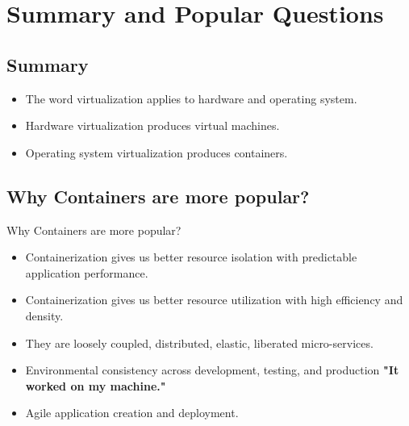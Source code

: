 

\section{Summary and Popular Questions}\label{sec:popular-questions}

\subsection{Summary}\label{subsec:summary}
\begin{frame}
    \begin{itemize}[<+- | alert@+>]
        \item The word virtualization applies to hardware and operating system.
        \item Hardware virtualization produces virtual machines.
        \item Operating system virtualization produces containers.
    \end{itemize}
\end{frame}

\subsection{Why Containers are more popular?}\label{subsec:containers-are-more-popular}
\begin{frame}{Why Containers are more popular?}
    \begin{itemize}[<+- | alert@+>]
        \item Containerization gives us better resource isolation with predictable application performance.
        \item Containerization gives us better resource utilization with high efficiency and density.
        \item They are loosely coupled, distributed, elastic, liberated micro-services.
        \item Environmental consistency across development, testing, and production \textbf{"It worked on my machine."}
        \item Agile application creation and deployment.
    \end{itemize}
\end{frame}


